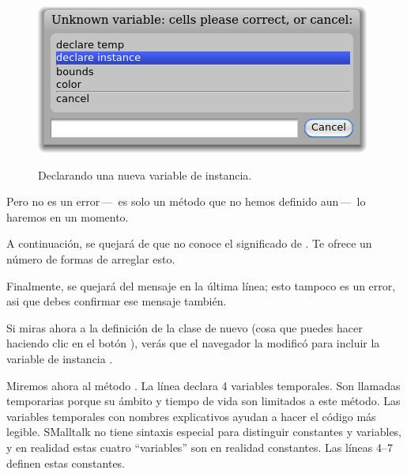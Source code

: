 \documentclass[a4paper,10pt,twoside]{book}
\begin{document}
\begin{figure}[htb]
\begin{minipage}{0.48\textwidth}
		{\includegraphics[scale=0.7]{DeclareInstanceVar}}
	\caption{Declarando una nueva variable de instancia.}
\end{minipage}
\end{figure}

Pero  no es un error\,---\, es solo un m\'etodo que no hemos definido aun\,---\, lo haremos en un momento.


A continuaci\'on, \pharo se quejar\'a de que no conoce el significado de . Te ofrece un n\'umero de formas de arreglar esto. 

Finalmente, \pharo se quejar\'a del mensaje  en la \'ultima l\'inea; esto tampoco es un error, asi que debes confirmar ese mensaje tambi\'en.

Si miras ahora a la definici\'on de la clase de nuevo (cosa que puedes hacer haciendo clic en el bot\'on ), ver\'as que el navegador la modific\'o para incluir la variable de instancia .

Miremos ahora al m\'etodo .
La l\'inea  declara 4 variables temporales. Son llamadas temporarias porque su \'ambito y tiempo de vida son limitados a este m\'etodo. Las variables temporales con nombres explicativos ayudan a hacer el c\'odigo m\'as legible. SMalltalk no tiene sintaxis especial para distinguir constantes y variables, y en realidad estas cuatro ``variables'' son en realidad constantes.
Las l\'ineas 4--7 definen estas constantes.
\end{document}
